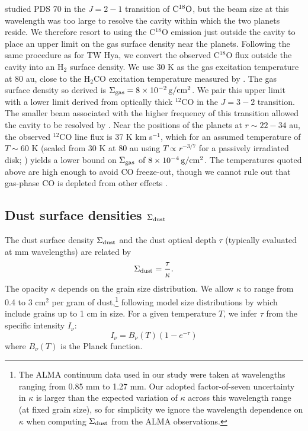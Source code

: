 \documentclass[fleqn,usenatbib]{mnras}
\newcommand{\Sigg}{\Sigma_{\rm gas}}
\newcommand{\Sigd}{\Sigma_{\rm dust}}
\newcommand{\gcm}{\rm g/cm^2}
\begin{document}
\cite{facchini_etal_2021} studied PDS 70 in the $J=2-1$ transition of $\rm C^{18}O$, but the beam size at this wavelength was too large to resolve the cavity within which the two planets reside. We therefore resort to using the C$^{18}$O emission just outside the cavity to place an upper limit on the gas surface density near the planets. Following the same procedure as for TW Hya, we convert the observed C$^{18}$O flux outside the cavity into an H$_2$ surface density. 
We use 30 K as the gas excitation temperature at 80 au, close to the H$_2$CO excitation temperature measured by \citet[][their figure 7]{facchini_etal_2021}. The gas 
surface density so derived is $\Sigg = 8 \times 10^{-2}\,\gcm$.
We pair this upper limit with a lower limit derived from optically thick $^{12}$CO in the $J=3-2$ transition. The smaller beam associated with the higher frequency of this transition allowed the cavity to be resolved by \citet{facchini_etal_2021}. Near the positions of the planets at $r \sim 22-34$ au, the observed $^{12}$CO line flux is 37 K km s$^{-1}$, which for an assumed temperature of $T \sim 60$ K (scaled from 30 K at 80 au using $T \propto r^{-3/7}$ for a passively irradiated disk; \citealt{chiang_goldreich_1997}) yields a lower bound on $\Sigg$ of $8\times 10^{-4}\,\gcm$. The temperatures quoted above are high enough to avoid CO freeze-out, though we cannot rule out that gas-phase CO is depleted from other effects \citep{schwarz_etal_2018}.


\subsection{Dust surface densities $\Sigd$}
\label{subsec:sigd}
The dust surface density $\Sigd$ and the dust optical depth $\tau$ (typically evaluated at mm wavelengths) are related by
\begin{equation}
    \Sigd = \frac{\tau}{\kappa} \label{eqn:Sigd}.
\end{equation}
The opacity $\kappa$ depends on the grain size distribution. We allow $\kappa$ to range from 0.4 to 3 cm$^{2}$ per gram of dust,\footnote{The ALMA continuum data used in our study were taken at wavelengths ranging from 0.85 mm to 1.27 mm. Our adopted factor-of-seven uncertainty in $\kappa$ is larger than the expected variation of $\kappa$ across this wavelength range (at fixed grain size), so for simplicity we ignore the wavelength dependence on $\kappa$ when computing $\Sigd$ from the ALMA observations.} following model size distributions by \citet{birnstiel_etal_2018} which include grains up to 1 cm in size. For a given temperature $T$, we infer $\tau$ from the specific intensity $I_{\nu}$:
\begin{equation}
    I_{\nu} = B_{\nu}(T)\left(1 - e^{-\tau}\right)
\label{eqn:Inu}
\end{equation}
where $B_{\nu}(T)$ is the Planck function. 
\end{document}
